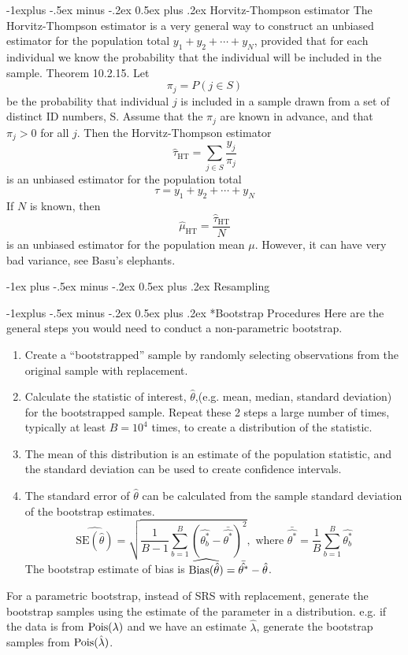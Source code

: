 \documentclass[10pt,landscape]{article}
\makeatletter
\renewcommand{\section}{\@startsection{section}{1}{0mm}%
                                {-1ex plus -.5ex minus -.2ex}%
                                {0.5ex plus .2ex}%
                                {\normalfont\large\bfseries}}
\renewcommand{\subsection}{\@startsection{subsection}{2}{0mm}%
                                {-1explus -.5ex minus -.2ex}%
                                {0.5ex plus .2ex}%
                                {\normalfont\normalsize\bfseries}}
\makeatother
\begin{document}
\begin{multicols*}{3}
\subsection{Horvitz-Thompson estimator}
The Horvitz-Thompson estimator is a very general way to construct an unbiased estimator for the population total $y_1+y_2+\cdots+y_N$, provided that for each individual we know the probability that the individual will be included in the sample.
Theorem 10.2.15. Let
$$
\pi_j=P(j \in S)
$$
be the probability that individual $j$ is included in a sample drawn from a set of distinct ID numbers, S. Assume that the $\pi_j$ are known in advance, and that $\pi_j>0$ for all $j$. Then the Horvitz-Thompson estimator
$$
\hat{\tau}_{\mathrm{HT}}=\sum_{j \in S} \frac{y_j}{\pi_j}
$$
is an unbiased estimator for the population total
$$
\tau=y_1+y_2+\cdots+y_N
$$
If $N$ is known, then
$$
\hat{\mu}_{\mathrm{HT}}=\frac{\hat{\tau}_{\mathrm{HT}}}{N}
$$
is an unbiased estimator for the population mean $\mu$. However, it can have very bad variance, see Basu's elephants.

\section{Resampling}

\subsection*{Bootstrap Procedures}
Here are the general steps you would need to conduct a non-parametric bootstrap.

\begin{enumerate}
    \item Create a ``bootstrapped'' sample by randomly selecting observations from the original sample with replacement. 
    \item Calculate the statistic of interest, $\hat{\theta}$,(e.g. mean, median, standard deviation) for the bootstrapped sample. Repeat these 2 steps a large number of times, typically at least $B=10^4$ times, to create a distribution of the statistic.
    \item The mean of this distribution is an estimate of the population statistic, and the standard deviation can be used to create confidence intervals.
    \item The standard error of $\hat{\theta}$ can be calculated from the sample standard deviation of the bootstrap estimates.
    $$\widehat{\text{SE}(\hat \theta)} =\sqrt{\frac{1}{B-1} \sum_{b=1}^{B}(\hat{\theta_b^*} - \bar{\hat{\theta^*}})^2}, \text{ where } \bar{\hat{\theta^*}} = \frac{1}{B} \sum_{b=1}^{B} \hat{\theta_b^*}$$
    The bootstrap estimate of bias is $\widehat{\operatorname{Bias}(\hat\theta)}=\bar{\hat{\theta^*}}-\hat\theta$.
\end{enumerate}
For a parametric bootstrap, instead of SRS with replacement, generate the bootstrap samples using the estimate of the parameter in a distribution. e.g. if the data is from $\operatorname{Pois}(\lambda)$ and we have an estimate $\hat\lambda$, generate the bootstrap samples from $\operatorname{Pois}(\hat\lambda)$.


\end{multicols*}
\end{document}
